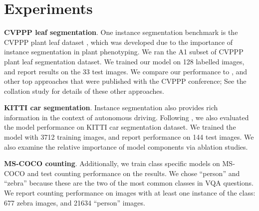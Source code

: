 \section{Experiments}

\textbf{CVPPP leaf segmentation}. One instance segmentation benchmark is the
CVPPP plant leaf dataset \cite{minervini14cvppp}, which was developed due to
the importance of instance segmentation in plant phenotyping. We ran the A1
subset of CVPPP plant leaf segmentation dataset. We trained our model on 128
labelled images, and report results on the 33 test images. We compare our
performance to \cite{romeraparedes15ris}, and other top approaches that were
published with the CVPPP conference; See the collation study
\cite{scharr16leaf} for details of these  other approaches.

\textbf{KITTI car segmentation}. Instance segmentation also provides rich
information in the context of autonomous driving. Following
\cite{zhang15insseg, zhang16insseg, uhrig16insseg}, we also evaluated the model
performance on KITTI car segmentation dataset. We trained the model with 3712
training images, and report performance on 144 test images. We also examine the
relative importance of model components via ablation studies.

\textbf{MS-COCO counting}. Additionally, we train class specific models on
MS-COCO and test counting performance on the results. We chose ``person'' and
``zebra'' because these are the two of the most common classes in VQA
questions. We report counting performance on images with at least one instance
of the class: 677 zebra images, and 21634 ``person'' images.







